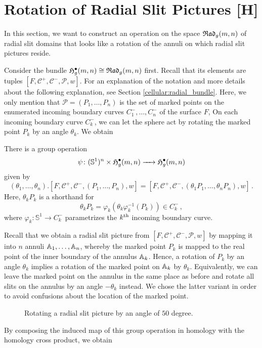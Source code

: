 \section{Rotation of Radial Slit Pictures [H]}
\label{homology_operations:rotation}

In this section, we want to construct an operation on the space ${\mathfrak{Rad}_g(m,n)}$ of radial slit domains that looks like a rotation of the annuli on which radial slit pictures reside.

Consider the bundle $\mathfrak{H}^{\bullet}_g(m, n) \cong {\mathfrak{Rad}_g(m,n)}$ first.
Recall that its elements are tuples $[F, \mathcal C^+, \mathcal C^-, \mathcal P, w]$.
For an explanation of the notation and more details about the following explanation, see Section \ref{cellular:radial_bundle}.
Here, we only mention that $\mathcal P = (P_1, \dotsc, P_n)$ is the set of marked points on the enumerated incoming boundary curves $C^-_1, \dotsc, C^-_n$ of the surface $F$, 
On each incoming boundary curve $C^-_k$, we can let the sphere act by rotating the marked point $P_k$ by an angle $\theta_k$.
We obtain

\begin{defi}
   There is a group operation
  \[
    \psi \colon (\mathbb S^1)^n \times \mathfrak{H}^{\bullet}_g(m, n) \xrightarrow{\hspace{6pt}{}\hspace{6pt}} \mathfrak{H}^{\bullet}_g(m, n)
  \]
  given by
  \[
    (\theta_1, \dotsc, \theta_n).[F, \mathcal C^+, \mathcal C^-, (P_1, \dotsc, P_n), w] = [F, \mathcal C^+, \mathcal C^-, (\theta_1 P_1, \dotsc, \theta_n P_n), w]\,.
  \]
  Here, $\theta_k P_k$ is a shorthand for 
  \[
  \theta_k P_k = \varphi_k(\theta_k\varphi_k^{-1}(P_k)) \in C^-_k\,,
  \]
  where $\varphi_k \colon \mathbb S^1 \to C^-_k$ parametrizes the $k^{\text{th}}$ incoming boundary curve.
\end{defi}

Recall that we obtain a radial slit picture from $[F, \mathcal C^+, \mathcal C^-, \mathcal P, w]$ by mapping it into $n$ annuli $\mathbb A_1, \dotsc, \mathbb A_n$,
whereby the marked point $P_k$ is mapped to the real point of the inner boundary of the annulus $\mathbb A_k$.
Hence, a rotation of $P_k$ by an angle $\theta_k$ implies a rotation of the marked point on $\mathbb A_k$ by $\theta_k$.
Equivalently, we can leave the marked point on the annulus in the same place as before and rotate all slits on the annulus by an angle $-\theta_k$ instead.
We chose the latter variant in order to avoid confusions about the location of the marked point.
\begin{figure}[ht]
  \centering
  \caption{\label{rotation} Rotating a radial slit picture by an angle of $50$ degree.}
  \end{figure}
By composing the induced map of this group operation in homology with the homology cross product, we obtain

